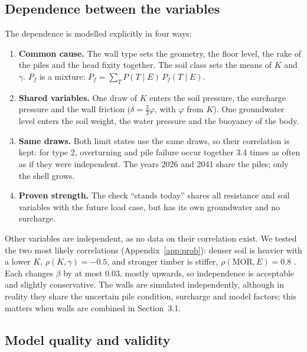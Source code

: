 \subsection{Dependence between the variables}\label{sec:prob-dependence}

The dependence is modelled explicitly in four ways:
\begin{enumerate}\setlength{\itemsep}{0pt}\setlength{\parskip}{0pt}
  \item \textbf{Common cause.} The wall type sets the geometry, the floor
    level, the rake of the piles and the head fixity together. The soil class
    sets the means of $K$ and $\gamma$. $P_f$ is a mixture:
    $P_f = \sum_T P(T \mid E)\,P_f(T \mid E)$.
  \item \textbf{Shared variables.} One draw of $K$ enters the soil pressure,
    the surcharge pressure and the wall friction ($\delta = \tfrac23\varphi$,
    with $\varphi$ from $K$). One groundwater level enters the soil weight,
    the water pressure and the buoyancy of the body.
  \item \textbf{Same draws.} Both limit states use the same draws, so their
    correlation is kept: for type 2, overturning and pile failure occur
    together 3.4 times as often as if they were independent. The years 2026
    and 2041 share the piles; only the shell grows.
  \item \textbf{Proven strength.} The check ``stands today'' shares all
    resistance and soil variables with the future load case, but has its own
    groundwater and no surcharge.
\end{enumerate}
Other variables are independent, as no data on their correlation exist. We
tested the two most likely correlations (Appendix~\ref{app:prob}): denser
soil is heavier with a lower $K$, $\rho(K,\gamma) = -0.5$, and stronger timber
is stiffer, $\rho(\text{MOR}, E) = 0.8$ \cite{jcss2001}. Each changes $\beta$
by at most 0.03, mostly upwards, so independence is acceptable and slightly
conservative. The walls are simulated independently, although in reality
they share the uncertain pile condition, surcharge and model factors; this
matters when walls are combined in Section~3.1.

\subsection{Model quality and validity}\label{sec:prob-validity}

